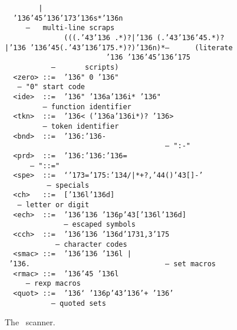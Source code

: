 \begin{figure}
{\mbox{\tt \ \ \ \ \ \ \ \ |\ \ {\char'136}{\char'45}{\char'136}{\char'173}{\char'136}s*{\char'136}n\ \ \ \ \ \ \ \ \ \ \ \ \ \ \ \ \ \ \ \ \ \ \ \ \ \ \ \ \ \ \ \ \ \ \ \ --\ \ \ multi-line\ scraps}\\
\mbox{\tt \ \ \ \ \ \ \ \ \ \ \ \ \ \ (((.{\char'43}{\char'136}\ .*)?|{\char'136}\ (.{\char'43}{\char'136}{\char'45}.*)?|{\char'136}\ {\char'136}{\char'45}(.{\char'43}{\char'136}{\char'175}.*)?){\char'136}n)*--\ \ \ \ \ \ (literate}\\
\mbox{\tt \ \ \ \ \ \ \ \ \ \ \ \ \ \ \ \ \ \ \ \ \ \ \ \ {\char'136}\ {\char'136}{\char'45}{\char'136}{\char'175}\ \ \ \ \ \ \ \ \ \ \ \ \ \ \ \ \ \ \ \ \ \ \ \ \ \ --\ \ \ \ \ \ \ scripts)}\\
\mbox{\tt \ \ <zero>\ ::=\ \ {\char'136}"\ 0\ {\char'136}"\ \ \ \ \ \ \ \ \ \ \ \ \ \ \ \ \ \ \ \ \ \ \ \ \ \ \ \ \ \ \ \ \ \ \ --\ "0"\ start\ code}\\
\mbox{\tt \ \ <ide>\ \ ::=\ \ {\char'136}"\ {\char'136}a{\char'136}i*\ {\char'136}"\ \ \ \ \ \ \ \ \ \ \ \ \ \ \ \ \ \ \ \ \ \ \ \ \ \ \ \ \ \ \ --\ function\ identifier}\\
\mbox{\tt \ \ <tkn>\ \ ::=\ \ {\char'136}<\ ({\char'136}a{\char'136}i*)?\ {\char'136}>\ \ \ \ \ \ \ \ \ \ \ \ \ \ \ \ \ \ \ \ \ \ \ \ \ \ \ \ --\ token\ identifier}\\
\mbox{\tt \ \ <bnd>\ \ ::=\ \ {\char'136}:{\char'136}-\ \ \ \ \ \ \ \ \ \ \ \ \ \ \ \ \ \ \ \ \ \ \ \ \ \ \ \ \ \ \ \ \ \ \ \ \ \ --\ ":-"}\\
\mbox{\tt \ \ <prd>\ \ ::=\ \ {\char'136}:{\char'136}:{\char'136}=\ \ \ \ \ \ \ \ \ \ \ \ \ \ \ \ \ \ \ \ \ \ \ \ \ \ \ \ \ \ \ \ \ \ \ \ --\ "::="}\\
\mbox{\tt \ \ <spe>\ \ ::=\ \ `{\char'173}={\char'175}:{\char'134}/|*+?,{\char'44}(){\char'43}[]-'\ \ \ \ \ \ \ \ \ \ \ \ \ \ \ \ \ \ \ \ \ \ --\ specials}\\
\mbox{\tt \ \ <ch>\ \ \ ::=\ \ [{\char'136}l{\char'136}d]\ \ \ \ \ \ \ \ \ \ \ \ \ \ \ \ \ \ \ \ \ \ \ \ \ \ \ \ \ \ \ \ \ \ \ \ --\ letter\ or\ digit}\\
\mbox{\tt \ \ <ech>\ \ ::=\ \ {\char'136}{\char'136}\ {\char'136}p{\char'43}[{\char'136}l{\char'136}d]\ \ \ \ \ \ \ \ \ \ \ \ \ \ \ \ \ \ \ \ \ \ \ \ \ \ \ \ \ \ --\ escaped\ symbols}\\
\mbox{\tt \ \ <cch>\ \ ::=\ \ {\char'136}{\char'136}\ {\char'136}d{\char'173}1,3{\char'175}\ \ \ \ \ \ \ \ \ \ \ \ \ \ \ \ \ \ \ \ \ \ \ \ \ \ \ \ \ \ \ \ --\ character\ codes}\\
\mbox{\tt \ \ <smac>\ ::=\ \ {\char'136}{\char'136}\ {\char'136}l\ |\ {\char'136}.\ \ \ \ \ \ \ \ \ \ \ \ \ \ \ \ \ \ \ \ \ \ \ \ \ \ \ \ \ \ \ \ --\ set\ macros}\\
\mbox{\tt \ \ <rmac>\ ::=\ \ {\char'136}{\char'45}\ {\char'136}l\ \ \ \ \ \ \ \ \ \ \ \ \ \ \ \ \ \ \ \ \ \ \ \ \ \ \ \ \ \ \ \ \ \ \ \ \ --\ rexp\ macros}\\
\mbox{\tt \ \ <quot>\ ::=\ \ {\char'136}`\ {\char'136}p{\char'43}{\char'136}'+\ {\char'136}'\ \ \ \ \ \ \ \ \ \ \ \ \ \ \ \ \ \ \ \ \ \ \ \ \ \ \ \ \ \ --\ quoted\ sets}
}
\caption{The \lx\ scanner.}\label{fig-lx}
\end{figure}

